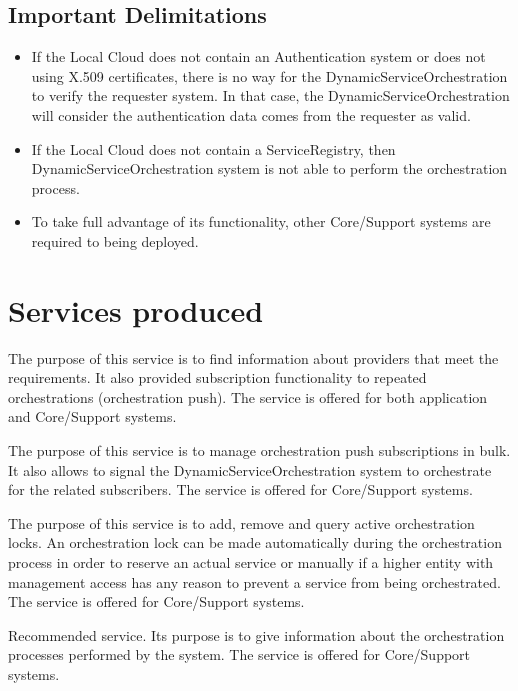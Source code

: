 \documentclass[a4paper]{arrowhead}
\begin{document}
\subsection{Important Delimitations}
\label{sec:delimitations}

\begin{itemize}
    \item If the Local Cloud does not contain an Authentication system or does not using X.509 certificates, there is no way for the DynamicServiceOrchestration to verify the requester system. In that case, the DynamicServiceOrchestration will consider the authentication data comes from the requester as valid.
    \item If the Local Cloud does not contain a ServiceRegistry, then DynamicServiceOrchestration system is not able to perform the orchestration process.
    \item To take full advantage of its functionality, other Core/Support systems are required to being deployed.
\end{itemize} 

\newpage

\section{Services produced}
\label{sec:services}

The purpose of this service is to find information about providers that meet the requirements. It also provided subscription functionality to repeated orchestrations (orchestration push). The service is offered for both application and Core/Support systems. 

The purpose of this service is to manage orchestration push subscriptions in bulk. It also allows to signal the DynamicServiceOrchestration system to orchestrate for the related subscribers. The service is offered for Core/Support systems. 

The purpose of this service is to add, remove and query active orchestration locks. An orchestration lock can be made automatically during the orchestration process in order to reserve an actual service or manually if a higher entity with management access has any reason to prevent a service from being orchestrated. The service is offered for Core/Support systems.

Recommended service. Its purpose is to give information about the orchestration processes performed by the system. The service is offered for Core/Support systems.
\end{document}
